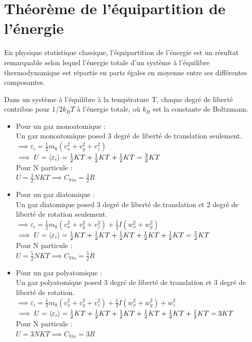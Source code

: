 \documentclass[12pt,oneside]{book}
\begin{document}
\section{Théorème de l’équipartition de l’énergie }
En physique statistique classique, l'équipartition de l'énergie est un résultat remarquable selon lequel l'énergie totale d'un système à l'équilibre thermodynamique est répartie en parts égales en moyenne entre ses différentes composantes.
\begin{center}
    Dans un système à l'équilibre à la température T, chaque degré de liberté contribue pour $1/2k_{B}T$ à l'énergie totale, où $k_{B}$ est la constante de Boltzmann.
\end{center}
\begin{itemize}
    \item Pour un gaz monoatomique : \\
          Un gaz monoatomique posed 3 degré de liberté de translation seulement. \\
          $\implies \varepsilon_i = \frac{1}{2}m_0(v_x^2 + v_y^2 + v_z^2) $ \\
          $\implies U = \langle \varepsilon_i \rangle =\frac{1}{2}KT + \frac{1}{2}KT + \frac{1}{2}KT = \frac{3}{2}KT $ \\
          Pour N particule :\\
          $U = \frac{3}{2}NKT \implies \boxed{C_{Vm} = \frac{3}{2}R}$
    \item Pour un gaz diatomique : \\
          Un gaz diatomique posed 3 degré de liberté de translation et 2 degré de liberté de rotation seulement. \\
          $\implies \varepsilon_i = \frac{1}{2}m_0(v_x^2 + v_y^2 + v_z^2) + \frac{1}{2}I(w_x^2 + w_y^2)$ \\
          $\implies U = \langle \varepsilon_i \rangle =\frac{1}{2}KT + \frac{1}{2}KT + \frac{1}{2}KT + \frac{1}{2}KT + \frac{1}{2}KT = \frac{5}{2}KT $ \\
          Pour N particule :\\
          $U = \frac{5}{2}NKT \implies \boxed{C_{Vm} = \frac{5}{2}R}$
    \item Pour un gaz polyatomique : \\
          Un gaz polyatomique posed 3 degré de liberté de translation et 3 degré de liberté de rotation. \\
          $\implies \varepsilon_i = \frac{1}{2}m_0(v_x^2 + v_y^2 + v_z^2) + \frac{1}{2}I(w_x^2 + w_y^2)+w_z^2$ \\
          $\implies U = \langle \varepsilon_i \rangle =\frac{1}{2}KT + \frac{1}{2}KT + \frac{1}{2}KT + \frac{1}{2}KT + \frac{1}{2}KT + \frac{1}{2}KT = 3KT$ \\
          Pour N particule :\\
          $U = 3NKT \implies \boxed{C_{Vm} = 3R}$
\end{itemize}
\end{document}
